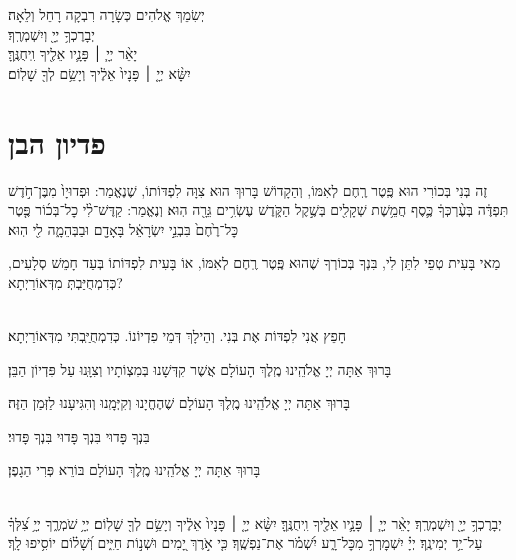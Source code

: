 \documentclass[twoside, openany, parskip=half, 11pt]{book}
\begin{document}
יְשִׂמֵךְ אֱלׂהִים כְּשָׂרָה רִבְקָה רָחֵל וְלֵאָה׃\\
יְבָרֶכְךָ֥ יְיָ֖ וְיִשְׁמְרֶֽךָ׃\\ 
יָאֵ֨ר יְיָ֧ ׀ פָּנָ֛יו אֵלֶ֖יךָ וִֽיחֻנֶּֽךָּ׃\\
יִשָּׂ֨א יְיָ֤ ׀ פָּנָיו֙ אֵלֶ֔יךָ וְיָשֵׂ֥ם לְךָ֖ שָׁלֽוֹם׃ \\

\chapter[פדיון הבן]{ פדיון הבן }


זֶה בְּנִי בְּכוֹרִי הוּא פֶּֽטֶר רֶֽחֶם לְאִמּוֹ, וְהַקָדוֹשׁ בָּרוּךְ הוּא צִוָּה לִפְדּוֹתוֹ, שֶׁנֶאֱמַר:
וּפְדוּיָו֙ מִבֶּן־חֹ֣דֶשׁ תִּפְדֶּ֔ה בְּעֶ֨רְכְּךָ֔ כֶּ֛סֶף חֲמֵ֥שֶׁת שְׁקָלִ֖ים בְּשֶׁ֣קֶל הַקֹּ֑דֶשׁ עֶשְׂרִ֥ים גֵּרָ֖ה הֽוּא׃
וְנֶאֱמַר:
קַדֶּשׁ־לִ֨י כׇל־בְּכ֜וֹר פֶּ֤טֶר כׇּל־רֶ֙חֶם֙ בִּבְנֵ֣י יִשְׂרָאֵ֔ל בָּאָדָ֖ם וּבַבְּהֵמָ֑ה לִ֖י הֽוּא׃

מַאי בָּעִית טְפֵי לִתֵּן לִי, בִּנְךָ בְּכוֹרְךָ שֶׁהוּא פֶּֽטֶר רֶֽחֶם לְאִמּוֹ, אוֹ בָּעִית לִפְדּוֹתוֹ בְּעַד חָמֵשׁ סְלָעִים, כְּדִמְחֻיַּבְתְּ מִדְּאוֹרַיְתָא?

\\
חָפֵץ אֲנִי לִפְדּוֹת אֶת בְּנִי. וְהֵילָךְ דְּמֵי פִדְיוֹנוֹ. כְּדִמְחֻיַּֽבְתִּי מִדְּאוֹרַיְתָא׃

בָּרוּךְ אַתָּה יְיָ אֱלֹהֵֽינוּ מֶֽלֶךְ הָעוֹלָם אֲשֶׁר קִדְּשָׁנוּ בְּמִצְוֹתָיו וְצִוָּֽנוּ עַל פִּדְיוֹן הַבֵּן׃

בָּרוּךְ אַתָּה יְיָ אֱלֹהֵֽינוּ מֶֽלֶךְ הָעוֹלָם שֶׁהֶחֱיָנוּ וְקִיְּמָֽנוּ וְהִגִּיעָנוּ לַזְּמַן הַזֶּה׃


בִּנְךָ פָּדוּי בִּנְךָ פָּדוּי בִּנְךָ פָּדוּי׃

בָּרוּךְ אַתָּה יְיָ אֱלֹהֵֽינוּ מֶֽלֶךְ הָעוֹלָם בּוֹרֵא פְּרִי הַגָפֶן׃

\\
%
יְבָרֶכְךָ֥ יְיָ֖ וְיִשְׁמְרֶֽךָ׃ יָאֵ֨ר יְיָ֧ ׀ פָּנָ֛יו אֵלֶ֖יךָ וִֽיחֻנֶּֽךָּ׃ יִשָּׂ֨א יְיָ֤ ׀ פָּנָיו֙ אֵלֶ֔יךָ וְיָשֵׂ֥ם לְךָ֖ שָׁלֽוֹם׃
יְיָ֥ שֹׁמְרֶ֑ךָ יְיָ֥ צִ֝לְּךָ֗ עַל־יַ֥ד יְמִינֶֽךָ׃
יְיָ֗ יִשְׁמׇרְךָ֥ מִכׇּל־רָ֑ע יִ֝שְׁמֹ֗ר אֶת־נַפְשֶֽׁךָ׃
כִּ֤י אֹ֣רֶךְ יָ֭מִים וּשְׁנ֣וֹת חַיִּ֑ים וְ֝שָׁל֗וֹם יוֹסִ֥יפוּ לָֽךְ׃
\end{document}
